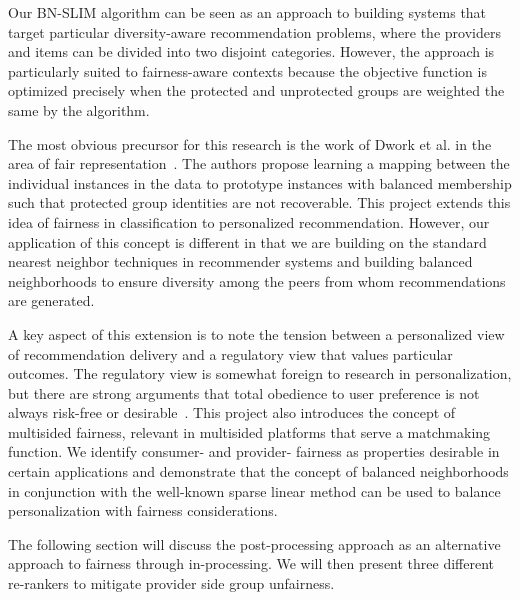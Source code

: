Our BN-SLIM algorithm can be seen as an approach to building systems that target particular diversity-aware recommendation problems, where the providers and items can be divided into two disjoint categories. However, the approach is particularly suited to fairness-aware contexts because the objective function is optimized precisely when the protected and unprotected groups are weighted the same by the algorithm. 

The most obvious precursor for this research is the work of Dwork et al. in the area of fair representation~\cite{zemel2013learning,Dwork2012individual}. The authors propose learning a mapping between the individual instances in the data to prototype instances with balanced membership such that protected group identities are not recoverable. This project extends this idea of fairness in classification to personalized recommendation. However, our application of this concept is different in that we are building on the standard nearest neighbor techniques in recommender systems and building balanced neighborhoods to ensure diversity among the peers from whom recommendations are generated.

A key aspect of this extension is to note the tension between a personalized view of recommendation delivery and a regulatory view that values particular outcomes. The regulatory view is somewhat foreign to research in personalization, but there are strong arguments that total obedience to user preference is not always risk-free or desirable~\cite{pariser2011filter,sunstein2009republic}. This project also introduces the concept of multisided fairness, relevant in multisided platforms that serve a matchmaking function. We identify consumer- and provider- fairness as properties desirable in certain applications and demonstrate that the concept of balanced neighborhoods in conjunction with the well-known sparse linear method can be used to balance personalization with fairness considerations.


The following section will discuss the post-processing approach as an alternative approach to fairness through in-processing. We will then present three different re-rankers to mitigate provider side group unfairness.


